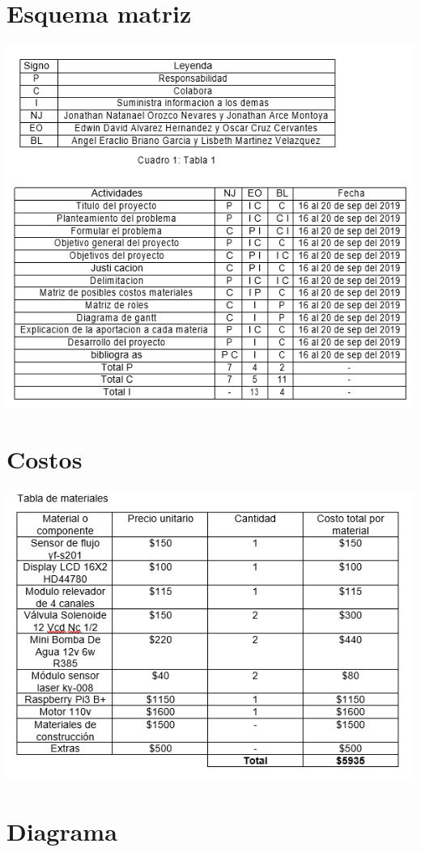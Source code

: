 \documentclass[12pt,a4paper]{report}
\begin{document}
\section{Esquema matriz}

\includegraphics[scale=1]{Esquema de matriz.png} 

\section{Costos}

\includegraphics[scale=1]{Costos.png} 

\section{Diagrama}
\end{document}
